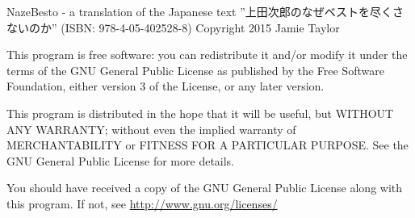 NazeBesto - a translation of the Japanese text ”上田次郎のなぜベストを尽くさないのか” (ISBN: 978-4-05-402528-8) Copyright 2015 Jamie Taylor
\par This program is free software: you can redistribute it and/or modify it under the terms of the GNU General Public License as published by the Free Software Foundation, either version 3 of the License, or any later version.
\par This program is distributed in the hope that it will be useful, but WITHOUT ANY WARRANTY; without even the implied warranty of MERCHANTABILITY or FITNESS FOR A PARTICULAR PURPOSE.  See the GNU General Public License for more details.
\par You should have received a copy of the GNU General Public License along with this program.  If not, see \href{http://www.gnu.org/licenses/}{http://www.gnu.org/licenses/}